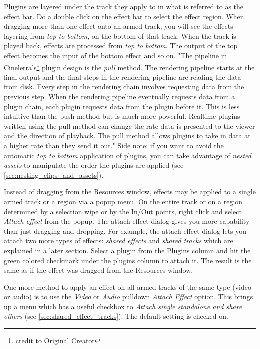 Plugins are layered under the track they apply to in what is referred to as the effect bar.  Do a double click on the effect bar to select the effect region.  When dragging more than one effect onto an armed track, you will see the effects layering from \textit{top to bottom}, on the bottom of that track. When the track is played back, effects are processed from \textit{top to bottom}. The output of the top effect becomes the input of the bottom effect and so on. "The pipeline in Cinelerra's\protect\footnote{credit to Original Creator} plugin design is the \textit{pull} method. The rendering pipeline starts at the final output and the final steps in the rendering pipeline are reading the data from disk. Every step in the rendering chain involves requesting data from the previous step. When the rendering pipeline eventually requests data from a plugin chain, each plugin requests data from the plugin before it. This is less intuitive than the push method but is much more powerful. Realtime plugins written using the pull method can change the rate data is presented to the viewer and the direction of playback. The pull method allows plugins to take in data at a higher rate than they send it out."  Side note: if you want to avoid the automatic \textit{top to bottom} application of plugins, you can take advantage of \textit{nested assets} to manipulate the order the plugins are applied (see  \ref{sec:nesting_clips_and_assets}).

Instead of dragging from the Resources window, effects may be applied to a single armed track or a region via a popup menu. On the entire track or on a region determined by a selection wipe or by the In/Out points, right click and select \textit{Attach effect}  from the popup. The attach effect dialog gives you more capability than just dragging and dropping. For example, the attach effect dialog lets you attach two more types of effects: \textit{shared effects} and \textit{shared tracks} which are explained in a later section. Select a plugin from the Plugins column and hit the green colored checkmark under the plugins column to attach it. The result is the same as if the effect was dragged from the Resources window.
 
One more method to apply an effect on all armed tracks of the same type (video or audio) is to use the \textit{Video} or \textit{Audio} pulldown \textit{Attach Effect} option. This brings up a menu which has a useful checkbox to \textit{Attach single standalone and share others} (see \ref{sec:shared_effect_tracks}). The default setting is checked on.


